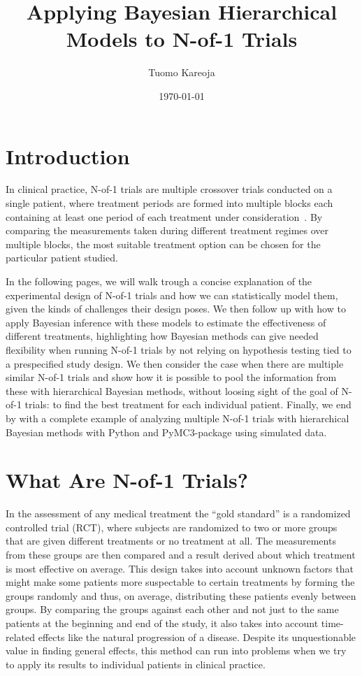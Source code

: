 \documentclass[12pt,a4paper,leqno]{report}
\title{Applying Bayesian Hierarchical Models to N-of-1 Trials}
\author{Tuomo Kareoja}
\date{\today}
\theoremstyle{plain}
\theoremstyle{definition}
\theoremstyle{remark}
\begin{document}
\maketitle

\tableofcontents

\chapter*{Introduction}\label{intro}

In clinical practice, N-of-1 trials are multiple crossover trials conducted on a
single patient, where treatment periods are formed into multiple blocks each
containing at least one period of each treatment under
consideration\ \cite{nofone}. By comparing the measurements taken during different
treatment regimes over multiple blocks, the most suitable treatment option can
be chosen for the particular patient studied.

In the following pages, we will walk trough a concise explanation of the
experimental design of N-of-1 trials and how we can statistically model them,
given the kinds of challenges their design poses. We then follow up with how to
apply Bayesian inference with these models to estimate the effectiveness of different
treatments, highlighting how Bayesian methods can give needed flexibility when
running N-of-1 trials by not relying on hypothesis testing tied to a
prespecified study design. We then consider the case when there are multiple
similar N-of-1 trials and show how it is possible to pool the information from
these with hierarchical Bayesian methods, without loosing sight of the goal of
N-of-1 trials: to find the best treatment for each individual
patient. Finally, we end by with a complete example of analyzing multiple N-of-1
trials with hierarchical Bayesian methods with Python and PyMC3-package using
simulated data.

\chapter{What Are N-of-1 Trials?}\label{nof1}

In the assessment of any medical treatment the ``gold standard'' is a randomized
controlled trial (RCT), where subjects are randomized to two or more groups that
are given different treatments or no treatment at all. The measurements from
these groups are then compared and a result derived about which treatment is
most effective on average. This design takes into account unknown factors that
might make some patients more suspectable to certain treatments by forming the
groups randomly and thus, on average, distributing these patients evenly between
groups. By comparing the groups against each other and not just to the same
patients at the beginning and end of the study, it also takes into account time-related
effects like the natural progression of a disease. Despite its unquestionable value
in finding general effects, this method can run into problems when we
try to apply its results to individual patients in clinical practice.
\end{document}
